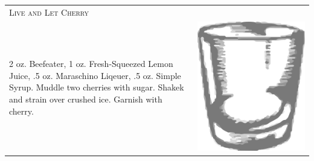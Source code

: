 \documentclass{article}
\begin{document}
\begin{tabular}{p{2in} p{0.5in}}
\multicolumn{2}{p{3in}}{\centering\Huge\textsc{Live and Let Cherry}} \\ 
   \vspace{-0.1in}2 oz. Beefeater, 1 oz. Fresh-Squeezed Lemon Juice, .5 oz. Maraschino Liqeuer, .5 oz. Simple Syrup. Muddle two cherries with sugar. Shakek and strain over crushed ice. Garnish with cherry. &
   \vspace{-0.1in} \includegraphics{rocks_glass.png}
\end{tabular}
\end{document}
